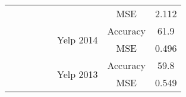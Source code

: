 \begin{table}[]
\begin{tabular}{|c|c|c|c|c|c|cc|}
                                                                                          &                                            &                                                   &                                                           &                                                                                                                        &                                                       & \multicolumn{1}{c|}{MSE}                                                                                                           & 2.112                      \\ \cline{6-8} 
                                                                                          &                                            &                                                   &                                                           &                                                                                                                        & \multirow{2}{*}{Yelp 2014}                            & \multicolumn{1}{c|}{Accuracy}                                                                                                      & 61.9                       \\ \cline{7-8} 
                                                                                          &                                            &                                                   &                                                           &                                                                                                                        &                                                       & \multicolumn{1}{c|}{MSE}                                                                                                           & 0.496                      \\ \cline{6-8} 
                                                                                          &                                            &                                                   &                                                           &                                                                                                                        & \multirow{2}{*}{Yelp 2013}                            & \multicolumn{1}{c|}{Accuracy}                                                                                                      & 59.8                       \\ \cline{7-8} 
                                                                                          &                                            &                                                   &                                                           &                                                                                                                        &                                                       & \multicolumn{1}{c|}{MSE}                                                                                                           & 0.549                      \\ \hline

\end{tabular}
\end{table}
